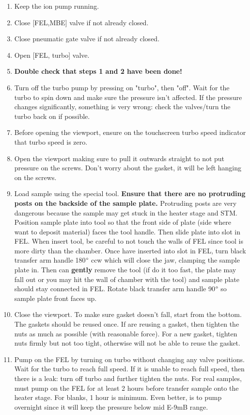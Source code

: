 \begin{enumerate}

\item 	Keep the ion pump running. 
\item Close [FEL,MBE] valve if not already closed.
\item   Close pneumatic gate valve if not already closed. 
\item   Open [FEL, turbo] valve.
\item \textbf{Double check that steps 1 and 2 have been done!}
\item	Turn off the turbo pump by pressing on "turbo", then "off". Wait for the turbo to spin down and make sure the pressure isn't affected. If the pressure changes significantly, something is very wrong: check the valves/turn the turbo back on if possible.
\item	Before opening the viewport, ensure on the touchscreen turbo speed indicator that turbo speed is zero. 
\item Open the viewport making sure to pull it outwards straight to not put pressure on the screws. Don't worry about the gasket, it will be left hanging on the screws.
\item Load sample using the special tool. \textbf{Ensure that there are no protruding posts on the backside of the sample plate.} Protruding posts are very dangerous because the sample may get stuck in the heater stage and STM. Position sample plate into tool so that the front side of plate (side where want to deposit material) faces the tool handle. Then slide plate into slot in FEL. When insert tool, be careful to not touch the walls of FEL since tool is more dirty than the chamber. Once have inserted into slot in FEL, turn black transfer arm handle 180$\degree$ ccw which will close the jaw, clamping the sample plate in. Then can \textbf{gently} remove the tool (if do it too fast, the plate may fall out or you may hit the wall of chamber with the tool) and sample plate should stay connected in FEL. Rotate black transfer arm handle 90$\degree$ so sample plate front faces up.
\item Close the viewport. To make sure gasket doesn't fall, start from the bottom. The gaskets should be reused once. If are reusing a gasket, then tighten the nuts as much as possible (with reasonable force). For a new gasket, tighten nuts firmly but not too tight, otherwise will not be able to reuse the gasket.
\item	Pump on the FEL by turning on turbo without changing any valve positions. Wait for the turbo to reach full speed. If it is unable to reach full speed, then there is a leak: turn off turbo and further tighten the nuts. For real samples, must pump on the FEL for at least 2 hours before transfer sample onto the heater stage. For blanks, 1 hour is minimum. Even better, is to pump overnight since it  will keep the pressure below mid E-9mB range.
\end{enumerate}

